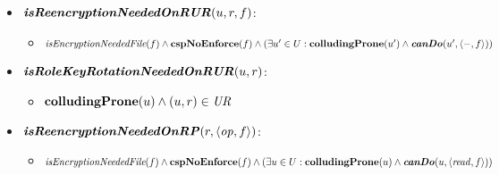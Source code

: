{\begin{itemize}
		\item \( \textbf{\textit{isReencryptionNeededOnRUR}}(u, r, f) \):
		\begin{itemize}
			\item \( \textit{isEncryptionNeededFile}(f) \land \mathbf{cspNoEnforce}(f) \land (\exists u' \in U : \mathbf{colludingProne}(u') \land \textbf{\textit{canDo}}(u', \langle -, \allowbreak f \rangle)) \)
		\end{itemize}
		
		\item \( \textbf{\textit{isRoleKeyRotationNeededOnRUR}}(u, r) \):
		\begin{itemize}
			\item \( \mathbf{colludingProne}(u) \land (u, r) \in \mathit{UR} \)
		\end{itemize}
		
		\item \( \textbf{\textit{isReencryptionNeededOnRP}}(r, \langle \mathit{op}, f \rangle) \):
		\begin{itemize}
			\item \( \textit{isEncryptionNeededFile}(f) \land \mathbf{cspNoEnforce}(f) \land (\exists u \in U : \mathbf{colludingProne}(u) \land \textbf{\textit{canDo}}(u, \langle \mathit{read}, \allowbreak f \rangle)) \)
		\end{itemize}
		
	\end{itemize}
}
